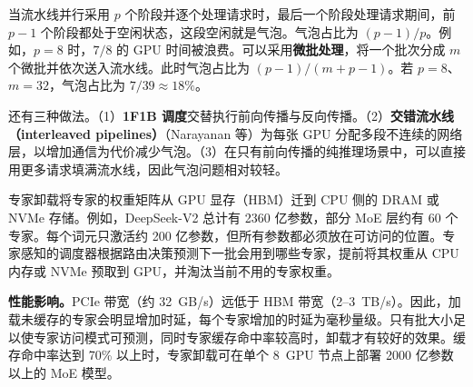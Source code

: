 \begin{interview}
当流水线并行采用 \(p\) 个阶段并逐个处理请求时，最后一个阶段处理请求期间，前 \(p-1\) 个阶段都处于空闲状态，这段空闲就是气泡。气泡占比为 \((p-1)/p\)。例如，\(p=8\) 时，\(7/8\) 的 GPU 时间被浪费。可以采用\textbf{微批处理}，将一个批次分成 \(m\) 个微批并依次送入流水线。此时气泡占比为 \((p-1)/(m+p-1)\)。若 \(p=8\)、\(m=32\)，气泡占比为 \(7/39\approx18\%\)。

还有三种做法。（1）\textbf{1F1B 调度}交替执行前向传播与反向传播。（2）\textbf{交错流水线（interleaved pipelines）}（Narayanan 等）为每张 GPU 分配多段不连续的网络层，以增加通信为代价减少气泡。（3）在只有前向传播的纯推理场景中，可以直接用更多请求填满流水线，因此气泡问题相对较轻。

专家卸载将专家的权重矩阵从 GPU 显存（HBM）迁到 CPU 侧的 DRAM 或 NVMe 存储。例如，DeepSeek-V2 总计有 2360 亿参数，部分 MoE 层约有 60 个专家。每个词元只激活约 200 亿参数，但所有参数都必须放在可访问的位置。专家感知的调度器根据路由决策预测下一批会用到哪些专家，提前将其权重从 CPU 内存或 NVMe 预取到 GPU，并淘汰当前不用的专家权重。

\textbf{性能影响。}PCIe 带宽（约 32~GB/s）远低于 HBM 带宽（2–3~TB/s）。因此，加载未缓存的专家会明显增加时延，每个专家增加的时延为毫秒量级。只有批大小足以使专家访问模式可预测，同时专家缓存命中率较高时，卸载才有较好的效果。缓存命中率达到 70\% 以上时，专家卸载可在单个 8~GPU 节点上部署 2000 亿参数以上的 MoE 模型。
\end{interview}
